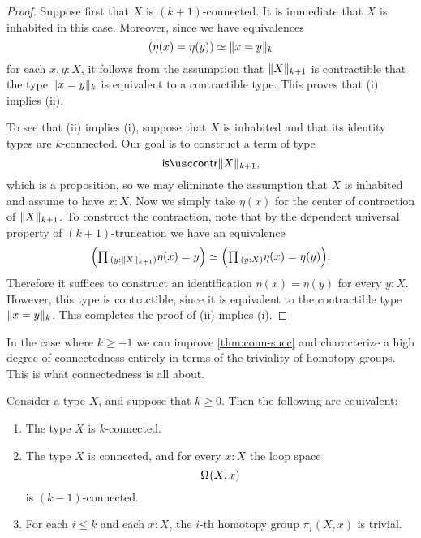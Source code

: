 \begin{proof}
  Suppose first that $X$ is $(k+1)$-connected. It is immediate that $X$ is inhabited in this case. Moreover, since we have equivalences
  \begin{equation*}
    (\eta(x)=\eta(y))\simeq \trunc{k}{x=y}
  \end{equation*}
  for each $x,y:X$, it follows from the assumption that $\trunc{k+1}{X}$ is contractible that the type $\trunc{k}{x=y}$ is equivalent to a contractible type. This proves that (i) implies (ii).

  To see that (ii) implies (i), suppose that $X$ is inhabited and that its identity types are $k$-connected. Our goal is to construct a term of type
  \begin{equation*}
    \iscontr\trunc{k+1}{X},
  \end{equation*}
  which is a proposition, so we may eliminate the assumption that $X$ is inhabited and assume to have $x:X$. Now we simply take $\eta(x)$ for the center of contraction of $\trunc{k+1}{X}$. To construct the contraction, note that by the dependent universal property of $(k+1)$-truncation we have an equivalence
  \begin{equation*}
    \Big(\prd{y:\trunc{k+1}{X}}\eta(x)=y\Big)\simeq\Big(\prd{y:X}\eta(x)=\eta(y)\Big).
  \end{equation*}
  Therefore it suffices to construct an identification $\eta(x)=\eta(y)$ for every $y:X$. However, this type is contractible, since it is equivalent to the contractible type $\trunc{k}{x=y}$. This completes the proof of (ii) implies (i).
\end{proof}

In the case where $k\geq -1$ we can improve \cref{thm:conn-succ} and characterize a high degree of connectedness entirely in terms of the triviality of homotopy groups. This is what connectedness is all about.

\begin{thm}\label{thm:conn-htpy-groups}
  Consider a type $X$, and suppose that $k\geq 0$. Then the following are equivalent:
  \begin{enumerate}
  \item The type $X$ is $k$-connected.
  \item The type $X$ is connected, and for every $x:X$ the loop space
    \begin{equation*}
      \loopspace{X,x}
    \end{equation*}
    is $(k-1)$-connected.
  \item For each $i\leq k$ and each $x:X$, the $i$-th homotopy group $\pi_i(X,x)$ is trivial.
  \end{enumerate}
\end{thm}

